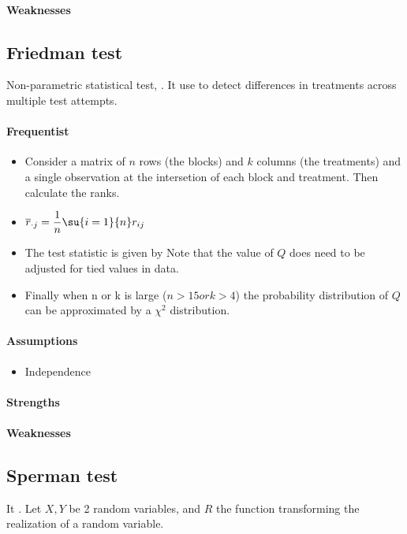 \paragraph{Weaknesses}

\subsection{Friedman test}
Non-parametric statistical test, .
It use to detect differences in treatments across multiple test attempts.
\paragraph{Frequentist}
\begin{itemize}
    \item Consider a matrix of $n$ rows (the blocks) and $k$ columns (the treatments)
    and a single observation at the intersetion of each block and treatment. Then 
    calculate the ranks.
    \item $\overline{r}_{\cdot j} = \dfrac{1}{n}\su{i=1}{n}r_{ij}$
    \item The test statistic is given by 
    Note that the value of $Q$ does need to be adjusted for tied values in data.
    \item Finally when n or k is large ($n>15 or k>4$) the probability distribution of $Q$ can be approximated by
    a $\chi^{2}$ distribution.
\end{itemize}

\paragraph{Assumptions}
\begin{itemize}
    \item Independence
\end{itemize}
\paragraph{Strengths}
\paragraph{Weaknesses}

\subsection{Sperman test}
It .
Let $X, Y$ be 2 random variables, and $R$ the function transforming the realization of a random variable.

